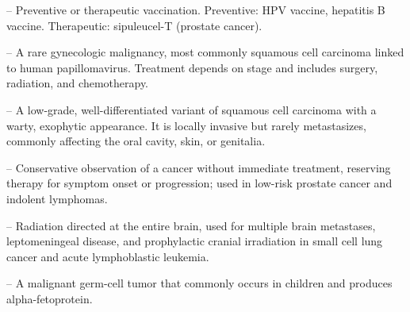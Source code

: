 -- Preventive or therapeutic vaccination. Preventive: HPV vaccine, hepatitis B vaccine. Therapeutic: sipuleucel-T (prostate cancer).

-- A rare gynecologic malignancy, most commonly squamous cell carcinoma linked to human papillomavirus. Treatment depends on stage and includes surgery, radiation, and chemotherapy.

-- A low-grade, well-differentiated variant of squamous cell carcinoma with a warty, exophytic appearance. It is locally invasive but rarely metastasizes, commonly affecting the oral cavity, skin, or genitalia.

-- Conservative observation of a cancer without immediate treatment, reserving therapy for symptom onset or progression; used in low-risk prostate cancer and indolent lymphomas.

-- Radiation directed at the entire brain, used for multiple brain metastases, leptomeningeal disease, and prophylactic cranial irradiation in small cell lung cancer and acute lymphoblastic leukemia.

-- A malignant germ-cell tumor that commonly occurs in children and produces alpha-fetoprotein.
